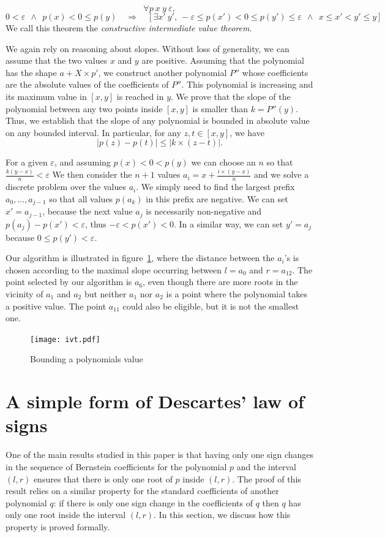 \documentclass{mscs}
\begin{document}
\[\forall p~x~y~\varepsilon,\]
\[0 < \varepsilon \ \ \wedge \ \
p(x) < 0 \leq p(y)\quad \Rightarrow \quad
[\exists x'~ y',\ -\varepsilon \leq p(x') < 0 \leq p(y') \leq
\varepsilon\ \  \wedge \ \
x \leq x' < y' \leq y]\]
We call this theorem the {\em constructive intermediate value theorem}.

We again rely on reasoning about slopes. Without loss of generality,
we can assume that the two values \(x\) and \(y\) are positive. Assuming
that the polynomial has the shape \(a + X \times p'\), we construct
another
polynomial \(P''\) whose coefficients are the absolute values of the
coefficients of \(P''\).  This polynomial is increasing and its maximum
value in \([x,y]\) is reached in \(y\).   We prove that the slope
of the polynomial between any two points inside \([x,y]\) is smaller than
\(k  = P''(y)\).  Thus, we establish that the
slope of any polynomial is bounded in absolute value on any bounded
interval.  In particular, for any \(z, t\in [x,y]\), we have
\[|p(z)-p(t)| \leq |k \times (z - t)|.\]

For a given \(\varepsilon\), and assuming \(p(x) < 0 < p(y)\) we can
choose an \(n\) so that \(\frac{k(y-x)}{n} < \varepsilon\)
 We then consider the
\(n+1\) values \(a_i = x + \frac{i\times (y-x)}{n}\) and we solve a
discrete problem over the values \(a_i\).  We simply need to find the
largest prefix \(a_0, \ldots, a_{j-1}\) so that all values \(p(a_k)\) in this
prefix are negative.  We can set \(x' =a_{j-1}\), because the next
value \(a_j\) is necessarily non-negative and
\(p(a_j) - p(x') < \varepsilon\), thus \(-\varepsilon < p(x') < 0\).
In a similar way, we can set \(y'= a_j\) because \(0 \leq p(y') < \varepsilon\).

Our algorithm is illustrated in figure~\ref{ivt}, where the distance
between the \(a_i\)'s is chosen according to the maximal slope
occurring between \(l=a_0\) and \(r=a_{12}\). The point selected by
our algorithm is \(a_6\), even though there are more roots in the
vicinity of \(a_1\) and \(a_2\) but neither \(a_1\) nor \(a_2\) is a
point where the polynomial takes a positive value.  The point \(a_{11}\) could
also be eligible, but it is not the smallest one.

\begin{figure}[h]\label{ivt}
\begin{center}
\texttt{[image: ivt.pdf]}\caption{Bounding a polynomials value}
\end{center}
\end{figure}
\section{A simple form of Descartes' law of signs}\label{sec:descartes}
One of the main results studied in this paper
is that having only one sign changes in the
sequence of Bernstein coefficients for the polynomial \(p\) and the
interval \((l,r)\) ensures that there is only one root of \(p\) inside
\((l,r)\).  The proof of this result relies on a similar property for
the standard coefficients of another polynomial \(q\): if there is
only one sign change in the coefficients of \(q\) then \(q\) has
only one root inside the interval \((l,r)\).  In this section, we
discuss how this property is proved formally.
\end{document}
